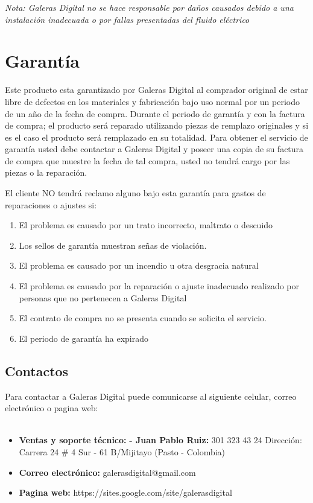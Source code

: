\documentclass[10pt,notitlepage,openany]{scrbook}
\begin{document}
\textit{Nota: Galeras Digital no se hace responsable por daños causados debido a una instalación inadecuada o por fallas presentadas del fluido eléctrico}

\chapter{Garantía}

Este producto esta garantizado por Galeras Digital al comprador original de estar libre de defectos en los materiales y fabricación bajo uso normal por un periodo de un año de la fecha de compra. Durante el periodo de garantía y con la factura de compra; el producto será reparado utilizando piezas de remplazo originales y si es el caso el producto será remplazado en su totalidad. Para obtener el servicio de garantía usted debe contactar a Galeras Digital y poseer una copia de su factura de compra que muestre la fecha de tal compra, usted no tendrá cargo por las piezas o la reparación.

El cliente NO tendrá reclamo alguno bajo esta garantía para gastos de reparaciones o ajustes si:

\begin{enumerate}
\item El problema es causado por un trato incorrecto, maltrato o descuido
\item Los sellos de garantía muestran señas de violación.
\item El problema es causado por un incendio u otra desgracia natural
\item El problema es causado por la reparación o ajuste inadecuado realizado por personas que no pertenecen a Galeras Digital
\item El contrato de compra no se presenta cuando se solicita el servicio.
\item El periodo de garantía ha expirado
\end{enumerate}

\newpage

\section{Contactos}

Para contactar a Galeras Digital puede comunicarse al siguiente celular, correo electrónico o pagina web:
\
\\
\\
\begin{itemize}
\item\textbf{Ventas y soporte técnico:}
\subitem\textbf{- Juan Pablo Ruiz:} 301 323 43 24  
\subitem \hspace{0.5cm}Dirección: Carrera 24 \# 4 Sur - 61 B/Mijitayo
\subitem \hspace{0.5cm}(Pasto - Colombia)
\item\textbf{Correo electrónico:} galerasdigital@gmail.com
\item\textbf{Pagina web:} https://sites.google.com/site/galerasdigital
\end{itemize}
\end{document}

